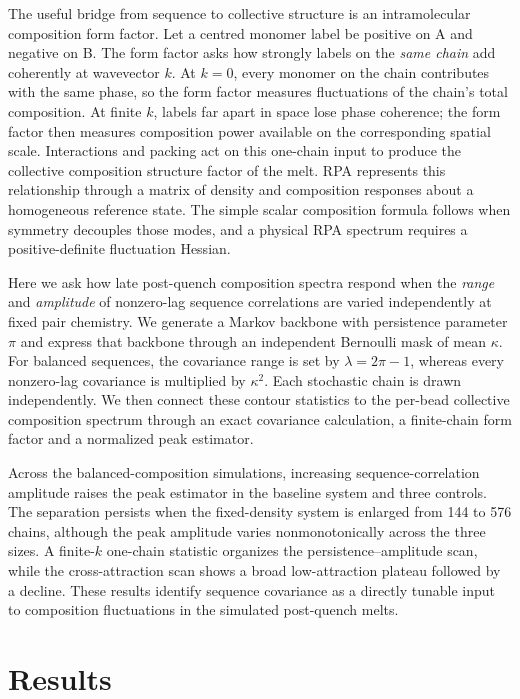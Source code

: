 \documentclass[pdflatex,sn-nature,onecolumn]{sn-jnl}
\begin{document}
The useful bridge from sequence to collective structure is an intramolecular composition form factor. Let a centred monomer label be positive on A and negative on B. The form factor asks how strongly labels on the \emph{same chain} add coherently at wavevector $k$. At $k=0$, every monomer on the chain contributes with the same phase, so the form factor measures fluctuations of the chain's total composition. At finite $k$, labels far apart in space lose phase coherence; the form factor then measures composition power available on the corresponding spatial scale. Interactions and packing act on this one-chain input to produce the collective composition structure factor of the melt. RPA represents this relationship through a matrix of density and composition responses about a homogeneous reference state. The simple scalar composition formula follows when symmetry decouples those modes, and a physical RPA spectrum requires a positive-definite fluctuation Hessian.

Here we ask how late post-quench composition spectra respond when the \emph{range} and \emph{amplitude} of nonzero-lag sequence correlations are varied independently at fixed pair chemistry. We generate a Markov backbone with persistence parameter $\pi$ and express that backbone through an independent Bernoulli mask of mean $\kappa$. For balanced sequences, the covariance range is set by $\lambda=2\pi-1$, whereas every nonzero-lag covariance is multiplied by $\kappa^2$. Each stochastic chain is drawn independently. We then connect these contour statistics to the per-bead collective composition spectrum through an exact covariance calculation, a finite-chain form factor and a normalized peak estimator.

Across the balanced-composition simulations, increasing sequence-correlation amplitude raises the peak estimator in the baseline system and three controls. The separation persists when the fixed-density system is enlarged from 144 to 576 chains, although the peak amplitude varies nonmonotonically across the three sizes. A finite-$k$ one-chain statistic organizes the persistence--amplitude scan, while the cross-attraction scan shows a broad low-attraction plateau followed by a decline. These results identify sequence covariance as a directly tunable input to composition fluctuations in the simulated post-quench melts.

\section{Results}
\end{document}
